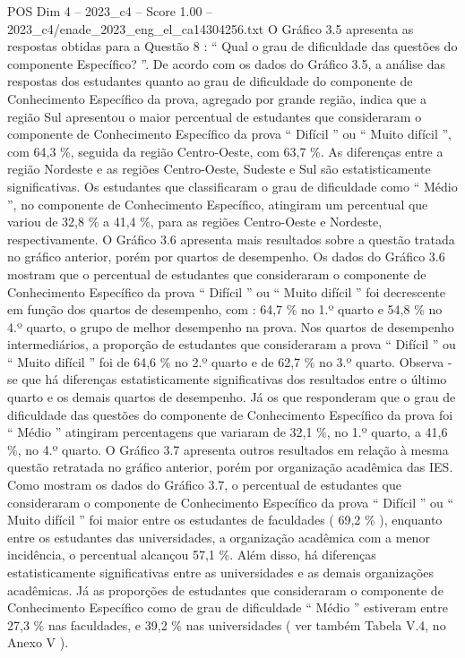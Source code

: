 \begin{textsample}{POS Dim 4 – 2023\_c4 – Score 1.00 – 2023\_c4/enade\_2023\_eng\_el\_ca14304256.txt}
O Gráfico 3.5 apresenta as respostas obtidas para a Questão 8 : “ Qual o grau de dificuldade das questões do componente Específico? ”.
De acordo com os dados do Gráfico 3.5, a análise das respostas dos estudantes quanto ao grau de dificuldade do componente de Conhecimento Específico da prova, agregado por grande região, indica que a região Sul apresentou o maior percentual de estudantes que consideraram o componente de Conhecimento Específico da prova “ Difícil ” ou “ Muito difícil ”, com 64,3 \%, seguida da região Centro-Oeste, com 63,7 \%.
As diferenças entre a região Nordeste e as regiões Centro-Oeste, Sudeste e Sul são estatisticamente significativas.
Os estudantes que classificaram o grau de dificuldade como “ Médio ”, no componente de Conhecimento Específico, atingiram um percentual que variou de 32,8 \% a 41,4 \%, para as regiões Centro-Oeste e Nordeste, respectivamente.
O Gráfico 3.6 apresenta mais resultados sobre a questão tratada no gráfico anterior, porém por quartos de desempenho.
Os dados do Gráfico 3.6 mostram que o percentual de estudantes que consideraram o componente de Conhecimento Específico da prova “ Difícil ” ou “ Muito difícil ” foi decrescente em função dos quartos de desempenho, com : 64,7 \% no 1.º quarto e 54,8 \% no 4.º quarto, o grupo de melhor desempenho na prova.
Nos quartos de desempenho intermediários, a proporção de estudantes que consideraram a prova “ Difícil ” ou “ Muito difícil ” foi de 64,6 \% no 2.º quarto e de 62,7 \% no 3.º quarto.
Observa -se que há diferenças estatisticamente significativas dos resultados entre o último quarto e os demais quartos de desempenho.
Já os que responderam que o grau de dificuldade das questões do componente de Conhecimento Específico da prova foi “ Médio ” atingiram percentagens que variaram de 32,1 \%, no 1.º quarto, a 41,6 \%, no 4.º quarto.
O Gráfico 3.7 apresenta outros resultados em relação à mesma questão retratada no gráfico anterior, porém por organização acadêmica das IES.
Como mostram os dados do Gráfico 3.7, o percentual de estudantes que consideraram o componente de Conhecimento Específico da prova “ Difícil ” ou “ Muito difícil ” foi maior entre os estudantes de faculdades ( 69,2 \% ), enquanto entre os estudantes das universidades, a organização acadêmica com a menor incidência, o percentual alcançou 57,1 \%.
Além disso, há diferenças estatisticamente significativas entre as universidades e as demais organizações acadêmicas.
Já as proporções de estudantes que consideraram o componente de Conhecimento Específico como de grau de dificuldade “ Médio ” estiveram entre 27,3 \% nas faculdades, e 39,2 \% nas universidades ( ver também Tabela V.4, no Anexo V ).

\end{textsample}
